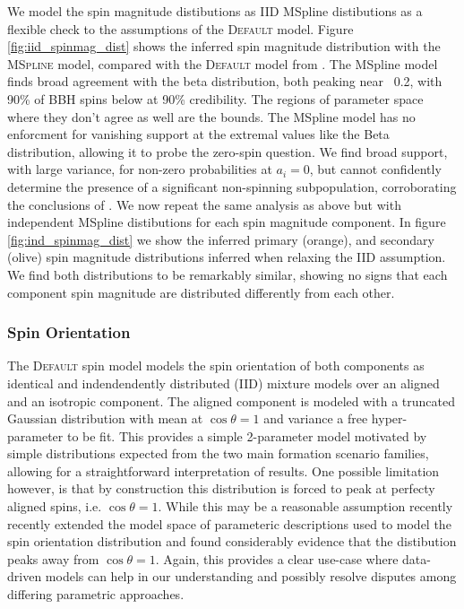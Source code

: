 We model the spin magnitude distibutions as IID MSpline distibutions as a flexible check
to the assumptions of the \textsc{Default} model. Figure \ref{fig:iid_spinmag_dist} shows the inferred spin magnitude distribution with the \textsc{MSpline} model, 
compared with the \textsc{Default} model from \citet{o3b_astro_dist}. The MSpline model finds broad agreement with the beta distribution, both peaking near ~0.2, with 90\% 
of BBH spins below \result{$\CIPlusMinus{\macros[MSplineIIDCompSpins][a_90percentile]}$} at 90\% credibility. The regions of parameter space where they don't agree as well are the bounds. 
The MSpline model has no enforcment for vanishing support at the extremal values like the Beta distribution, 
allowing it to probe the zero-spin question. We find broad support, with large variance, for non-zero probabilities at $a_i=0$, but cannot confidently determine the presence of 
a significant non-spinning subpopulation, corroborating the conclusions of \citet{BuildBetterSpinModels,Callister_NoEvidence,GWTC3MonashSpin}. 
We now repeat the same analysis as above but with independent MSpline distibutions for each spin magnitude component. In figure \ref{fig:ind_spinmag_dist} 
we show the inferred primary (orange), and secondary (olive) spin magnitude distributions inferred when relaxing the IID assumption. We find both 
distributions to be remarkably similar, showing no signs that each component spin magnitude are distributed differently from each other.

\subsubsection{Spin Orientation}

The \textsc{Default} spin model models the spin orientation of both components as identical and indendendently distributed (IID) mixture models over an
aligned and an isotropic component. The aligned component is modeled with a truncated Gaussian distribution with mean at $\cos{\theta}=1$ and variance a free 
hyper-parameter to be fit. This provides a simple 2-parameter model motivated by simple distributions expected from the two main formation scenario families, allowing 
for a straightforward interpretation of results. One possible limitation however, is that by construction this distribution is forced to peak at perfecty aligned spins, 
i.e. $\cos{\theta}=1$. While this may be a reasonable assumption recently \citet{spinitasyoulike} recently extended the model space of parameteric descriptions 
used to model the spin orientation distribution and found considerably evidence that the distibution peaks away from $\cos{\theta}=1$. Again, this provides a clear 
use-case where data-driven models can help in our understanding and possibly resolve disputes among differing parametric approaches.

